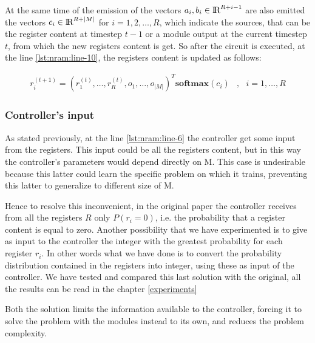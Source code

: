 At the same time of the emission of the vectors $a_{i}, b_{i} \in \textrm{I\!R}^{R+i-1}$ are also emitted the vectors $c_i \in \textrm{I\!R}^{R+|M|}$ for $i = 1, 2, \dots, R$, which indicate the sources, that can be the register content at timestep $t-1$ or a module output at the current timestep $t$, from which the new registers content is get. So after the circuit is executed, at the line \ref{lst:nram:line-10}, the registers content is updated as follows:
\begin{center}
	\begin{equation}
		\begin{split}
			r_i^{(t + 1)} = (r_1^{(t)}, \dots, r_R^{(t)}, o_1, \dots, o_{|M|})^T\textbf{softmax}(c_i) &,\ \ \ i = 1,\dots,R
		\end{split}
	\end{equation}
\end{center}

\subsubsection*{Controller's input}
As stated previously, at the line \ref{lst:nram:line-6} the controller get some input from the registers. This input could be all the registers content, but in this way the controller's parameters would depend directly on M. This case is undesirable because this latter could learn the specific problem on which it trains, preventing this latter to generalize to different size of M. 

Hence to resolve this inconvenient, in the original paper the controller receives from all the registers $R$ only $P(r_{i} = 0)$, i.e. the probability that a register content is equal to zero. Another possibility that we have experimented is to give as input to the controller the integer with the greatest probability for each register $r_{i}$. In other words what we have done is to convert the probability distribution contained in the registers into integer, using these as input of the controller. We have tested and compared this last solution with the original, all the results can be read in the chapter \ref{experiments}

Both the solution limits the information available to the controller, forcing it to solve the problem with the modules instead to its own, and reduces the problem complexity.